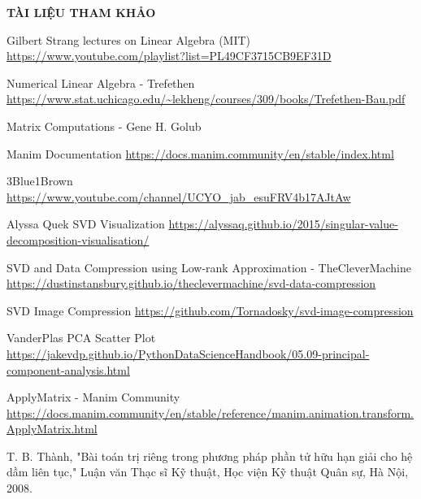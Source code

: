 \newpage
\thispagestyle{empty}

\begin{center}
    {\Large\bfseries\color{central_blue} TÀI LIỆU THAM KHẢO}
\end{center}


\begin{enumerate}[label={[{\arabic*}]}]
    \item Gilbert Strang lectures on Linear Algebra (MIT) \url{https://www.youtube.com/playlist?list=PL49CF3715CB9EF31D}
    \item Numerical Linear Algebra - Trefethen \url{https://www.stat.uchicago.edu/~lekheng/courses/309/books/Trefethen-Bau.pdf}
    \item Matrix Computations - Gene H. Golub
    \item Manim Documentation \url{https://docs.manim.community/en/stable/index.html}
    \item 3Blue1Brown \url{https://www.youtube.com/channel/UCYO_jab_esuFRV4b17AJtAw}
    \item Alyssa Quek SVD Visualization \url{https://alyssaq.github.io/2015/singular-value-decomposition-visualisation/}
    \item SVD and Data Compression using Low-rank Approximation - TheCleverMachine \url{https://dustinstansbury.github.io/theclevermachine/svd-data-compression}
    \item SVD Image Compression \url{https://github.com/Tornadosky/svd-image-compression}
    \item VanderPlas PCA Scatter Plot \url{https://jakevdp.github.io/PythonDataScienceHandbook/05.09-principal-component-analysis.html}
    \item ApplyMatrix - Manim Community \url{https://docs.manim.community/en/stable/reference/manim.animation.transform.ApplyMatrix.html}
    \item T. B. Thành, "Bài toán trị riêng trong phương pháp phần tử hữu hạn giải cho hệ dầm liên tục," Luận văn Thạc sĩ Kỹ thuật, Học viện Kỹ thuật Quân sự, Hà Nội, 2008.
\end{enumerate}
